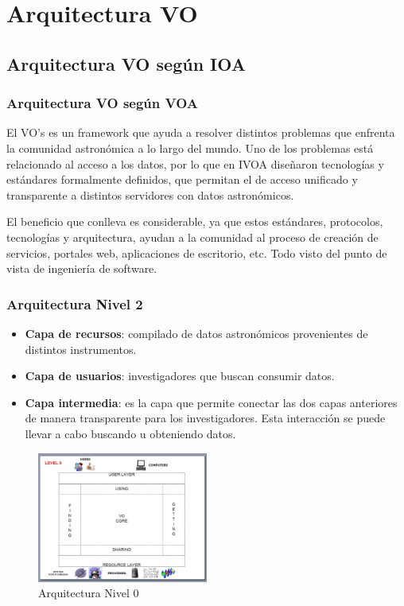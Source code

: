 \section{Arquitectura VO}

\subsection{Arquitectura VO según IOA}

\begin{frame}
\frametitle{Arquitectura VO según VOA}
El VO's es un framework que ayuda a resolver distintos
problemas que enfrenta la comunidad astronómica a lo largo del mundo.  Uno de
los problemas está relacionado al acceso a los datos, por lo que en IVOA
diseñaron tecnologías y estándares formalmente definidos, que permitan el de
acceso unificado y transparente a distintos servidores con datos astronómicos.

El beneficio que conlleva es considerable, ya que estos
estándares, protocolos, tecnologías y arquitectura, ayudan a la comunidad al
proceso de creación de servicios, portales web, aplicaciones de escritorio,
etc. Todo visto del punto de vista de ingeniería de software.
\end{frame}

\begin{frame}
\frametitle{Arquitectura Nivel 2}
\begin{multicols}{2}
\begin{itemize}
    \item \textbf{Capa de recursos}:
          compilado de datos astronómicos provenientes de distintos instrumentos.
    \item \textbf{Capa de usuarios}:
          investigadores que buscan consumir datos.
    \item \textbf{Capa intermedia}:
          es la capa que permite conectar las dos
          capas anteriores de manera transparente para los investigadores.
          Esta interacción se puede llevar a cabo buscando u obteniendo datos.
\end{itemize}

\begin{figure}[h!t]
    \centering
    \includegraphics[width=0.5\textwidth]{img/arquitectura_0.png}
    \caption{Arquitectura Nivel 0}
    \label{fig:nivel0}
\end{figure}

\end{multicols}
\end{frame}


